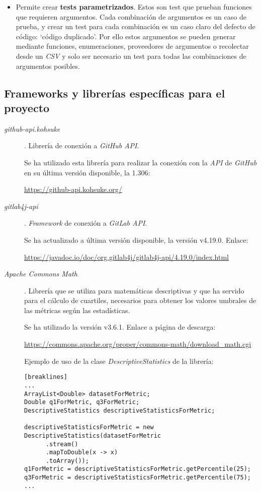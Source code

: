 \begin{description}
\begin{itemize}
			\item Permite crear \textbf{tests parametrizados}. Estos son test que prueban funciones que requieren argumentos. Cada combinación de argumentos es un caso de prueba, y crear un test para cada combinación es un caso claro del defecto de código: `código duplicado'. Por ello estos argumentos se pueden generar mediante funciones, enumeraciones, proveedores de argumentos o recolectar desde un \textit{CSV} y solo ser necesario un test para todas las combinaciones de argumentos posibles.
		\end{itemize}
\end{description}
\subsection{Frameworks y librerías específicas para el proyecto}
\begin{description}
	\item[\textit{github-api.kohsuke}]. Librería de conexión a \textit{GitHub API}. 
	
		Se ha utilizado esta librería para realizar la conexión con la \textit{API} de \textit{GitHub} en su última versión disponible, la 1.306:
		
		\url{https://github-api.kohsuke.org/}
		
		
	\item[\textit{gitlab4j-api}]. \textit{Framework} de conexión a \textit{GitLab API}. 
	
		Se ha actualizado a última versión disponible, la versión  v4.19.0. Enlace:
		
	\url{https://javadoc.io/doc/org.gitlab4j/gitlab4j-api/4.19.0/index.html}
		
		
			
	\item[\textit{Apache Commons Math}]. Librería que se utiliza para matemáticas descriptivas y que ha servido para el cálculo de cuartiles, necesarios para obtener los valores umbrales de las métricas según las estadísticas. 
	
		Se ha utilizado la versión  v3.6.1. Enlace a página de descarga:
	
		\url{https://commons.apache.org/proper/commons-math/download_math.cgi}
		
		Ejemplo de uso de la clase \textit{DescriptiveStatistics} de la librería:
		
\begin{minipage}{\linewidth}
{\tiny 
\begin{verbatim}[breaklines]
...
ArrayList<Double> datasetForMetric;
Double q1ForMetric, q3ForMetric;
DescriptiveStatistics descriptiveStatisticsForMetric;

descriptiveStatisticsForMetric = new DescriptiveStatistics(datasetForMetric
	  .stream()
	  .mapToDouble(x -> x)
	  .toArray());
q1ForMetric = descriptiveStatisticsForMetric.getPercentile(25);
q3ForMetric = descriptiveStatisticsForMetric.getPercentile(75);
...
\end{verbatim}
}
\end{minipage}		

\end{description}
